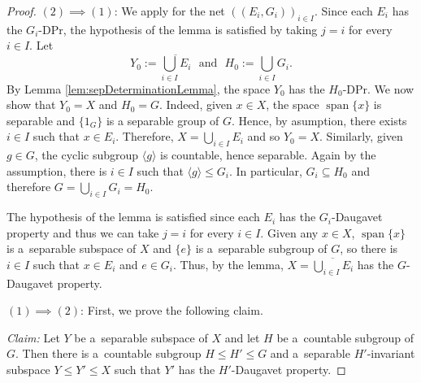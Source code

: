 \documentclass[a4paper,12pt]{amsart}
\theoremstyle{definition}
\theoremstyle{definition}
\theoremstyle{remark}
\numberwithin{equation}{section}
\renewcommand{\leq}{\leqslant}
\newcommand{\<}{\langle}
\renewcommand{\>}{\rangle}
\newcommand{\spann}{\operatorname{span}}
\begin{document}
	\begin{proof}
		$(2) \implies (1)$: We apply  for the net $((E_i, G_i))_{i \in I}$. Since each $E_i$ has the $G_i$-DPr, the hypothesis of the lemma is satisfied by taking $j=i$ for every $i \in I$. Let 
		\begin{equation*}
			Y_0:= \overline{\bigcup_{i\in I} E_i} \ \ \ \mbox{and} \ \ \ H_0 := \bigcup_{i \in I} G_i.
		\end{equation*}
		By Lemma \ref{lem:sepDeterminationLemma}, the space $Y_0$ has the $H_0$-DPr. We now show that $Y_0 = X$ and $H_0 = G$. Indeed, given $x \in X$, the space $\spann\{x\}$ is separable and $\{1_G\}$ is a separable group of $G$. Hence, by asumption, there exists $i \in I$ such that $x \in E_i$. Therefore, $X = \bigcup_{i \in I} E_i$ and so $Y_0 = X$. Similarly, given $g \in G$, the cyclic subgroup $\langle g \rangle$ is countable, hence separable. Again by the assumption, there is $i \in I$ such that $\langle g \rangle \leq G_i$. In particular, $G_i \subseteq H_0$ and therefore $G = \bigcup_{i \in I} G_i = H_0$.
		
		
		
		
		The hypothesis of the lemma is satisfied since each $E_i$ has the $G_i$-Daugavet property and thus we can take $j = i$ for every $i \in I$. Given any $x \in X$, $\spann\{x\}$ is a~separable subspace of $X$ and $\{e\}$ is a~separable subgroup of $G$, so there is $i \in I$ such that $x \in E_i$ and $e \in G_i$. Thus, by the lemma, $X = \overline{\bigcup_{i \in I} E_i}$ has the $G$-Daugavet property.
		
		
		\noindent
		$(1) \implies (2)$: First, we prove the following claim.
		
		\emph{Claim:}
		Let $Y$ be a~separable subspace of $X$ and let $H$ be a~countable subgroup of $G$. Then there is a~countable subgroup $H \leq H' \leq G$ and a~separable $H'$-invariant subspace $Y \leq Y' \leq X$ such that $Y'$ has the $H'$-Daugavet property.
		

\end{proof}
\end{document}
